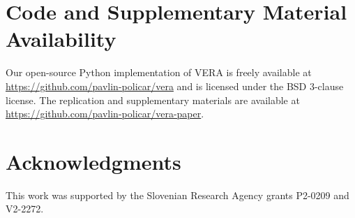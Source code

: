 \documentclass[lettersize,journal]{IEEEtran}
\begin{document}
\section*{Code and Supplementary Material Availability}

Our open-source Python implementation of VERA is freely available at \url{https://github.com/pavlin-policar/vera} and is licensed under the BSD 3-clause license. The replication and supplementary materials are available at \url{https://github.com/pavlin-policar/vera-paper}.


\section*{Acknowledgments}
This work was supported by the Slovenian Research Agency grants P2-0209 and V2-2272.

%









\end{document}
